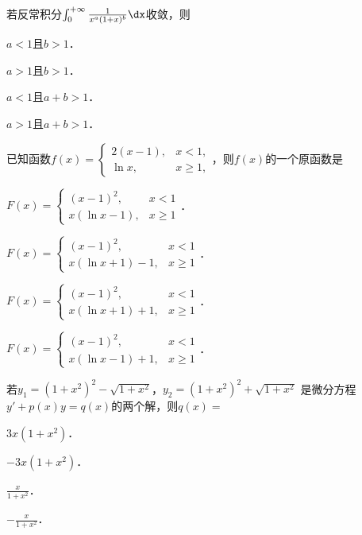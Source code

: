 \documentclass[plain,noanswer,medmath]{../../template/jnuexam}
\begin{document}




\begin{problem}
若反常积分$\int_0^{+\infty} \frac{1}{x^a(1+x)^b}\dx$收敛，则\pickout{}
\begin{abcd}
\item $a < 1$且$b > 1$．
\item $a > 1$且$b > 1$．
\item $a < 1$且$a + b > 1$．
\item $a > 1$且$a + b > 1$．
\end{abcd}
\end{problem}


\begin{problem}
已知函数$f(x) = \begin{cases}
  2(x - 1), & x < 1, \\
     \ln x, & x \ge 1,
\end{cases}$，则$f(x)$的一个原函数是\pickout{}
\begin{abcd}
\item $F(x) = \begin{cases}
                 (x - 1)^2, & x < 1 \\
  x\left(\ln x - 1 \right), & x \ge 1
\end{cases}$．
\item $F(x) = \begin{cases}
                     (x - 1)^2, & x < 1 \\
  x\left(\ln x + 1 \right) - 1, & x \ge 1
\end{cases}$．
\item $F(x) = \begin{cases}
                     (x - 1)^2, & x < 1 \\
  x\left(\ln x + 1 \right) + 1, & x \ge 1
\end{cases}$．
\item $F(x) = \begin{cases}
                     (x - 1)^2, & x < 1 \\
  x\left(\ln x - 1 \right) + 1, & x \ge 1
\end{cases}$．
\end{abcd}
\end{problem}


\begin{problem}
若$y_1 = \left(1 + x^2 \right)^2 - \sqrt{1 + x^2}$，$y_2 = \left(1 + x^2 \right)^2 + \sqrt{1 + x^2}$
是微分方程$y' + p(x)y = q(x)$的两个解，则$q(x) =$\pickout{}
\begin{abcd}
\item $3x\left(1 + x^2 \right)$．
\item $- 3x\left(1 + x^2 \right)$．
\item $\frac{x}{1 + x^2}$．
\item $- \frac{x}{1 + x^2}$．
\end{abcd}
\end{problem}
\end{document}
